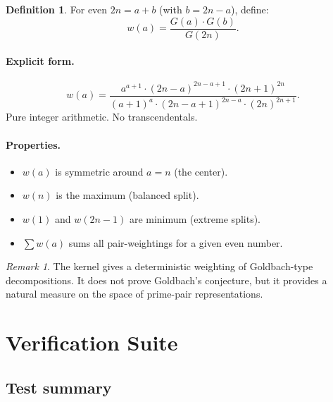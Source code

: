 \documentclass[11pt,a4paper]{article}
\theoremstyle{definition}
\newtheorem{definition}[theorem]{Definition}
\theoremstyle{remark}
\newtheorem{remark}[theorem]{Remark}
\begin{document}
\begin{definition}\label{def:goldbach}
For even $2n = a + b$ (with $b = 2n - a$), define:
\begin{equation}\label{eq:goldbach}
  w(a) = \frac{G(a)\cdot G(b)}{G(2n)}.
\end{equation}
\end{definition}

\paragraph{Explicit form.}
\begin{equation}\label{eq:goldbachexplicit}
  w(a) = \frac{a^{a+1}\cdot(2n-a)^{2n-a+1}\cdot(2n+1)^{2n}}{(a+1)^{a}\cdot(2n-a+1)^{2n-a}\cdot(2n)^{2n+1}}.
\end{equation}
Pure integer arithmetic. No transcendentals.

\paragraph{Properties.}
\begin{itemize}
  \item $w(a)$ is symmetric around $a=n$ (the center).
  \item $w(n)$ is the maximum (balanced split).
  \item $w(1)$ and $w(2n-1)$ are minimum (extreme splits).
  \item $\sum w(a)$ sums all pair-weightings for a given even number.
\end{itemize}

\begin{remark}\label{rem:goldbach}
The kernel gives a deterministic weighting of Goldbach-type decompositions. It does not prove Goldbach's conjecture, but it provides a natural measure on the space of prime-pair representations.
\end{remark}

\section{Verification Suite}\label{sec:verify}

\subsection{Test summary}
\end{document}
